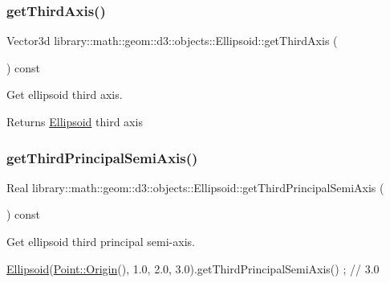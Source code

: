 \subsubsection{\texorpdfstring{get\+Third\+Axis()}{getThirdAxis()}}
{\footnotesize\ttfamily Vector3d library\+::math\+::geom\+::d3\+::objects\+::\+Ellipsoid\+::get\+Third\+Axis (\begin{DoxyParamCaption}{ }\end{DoxyParamCaption}) const}



Get ellipsoid third axis. 

\begin{DoxyReturn}{Returns}
\hyperlink{classlibrary_1_1math_1_1geom_1_1d3_1_1objects_1_1_ellipsoid}{Ellipsoid} third axis 
\end{DoxyReturn}
\mbox{\label{classlibrary_1_1math_1_1geom_1_1d3_1_1objects_1_1_ellipsoid_a62b97423985083db726d34eced6b58ae}} 
\subsubsection{\texorpdfstring{get\+Third\+Principal\+Semi\+Axis()}{getThirdPrincipalSemiAxis()}}
{\footnotesize\ttfamily Real library\+::math\+::geom\+::d3\+::objects\+::\+Ellipsoid\+::get\+Third\+Principal\+Semi\+Axis (\begin{DoxyParamCaption}{ }\end{DoxyParamCaption}) const}



Get ellipsoid third principal semi-\/axis. 


\begin{DoxyCode}
\hyperlink{classlibrary_1_1math_1_1geom_1_1d3_1_1objects_1_1_ellipsoid_aae81fe0edc7f0e8d4590ea89ae73cb14}{Ellipsoid}(\hyperlink{classlibrary_1_1math_1_1geom_1_1d3_1_1objects_1_1_point_ab2a38e285c562e50bf350272c083986f}{Point::Origin}(), 1.0, 2.0, 3.0).getThirdPrincipalSemiAxis() ; \textcolor{comment}{// 3.0}
\end{DoxyCode}


